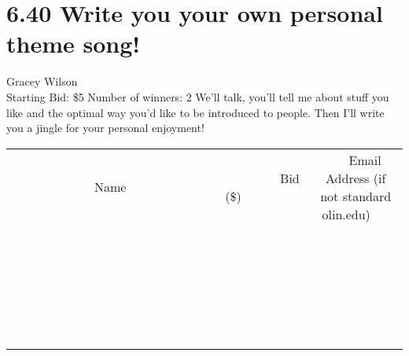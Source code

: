 \documentclass[11pt]{article}
\begin{document}
\section*{6.40 Write you your own personal theme song!}
Gracey Wilson
\\
Starting Bid: \$5
\newline
Number of winners: 2
\newline
We'll talk, you'll tell me about stuff you like and the optimal way you'd like to be introduced to people. Then I'll write you a jingle for your personal enjoyment!
\\[6ex]
\begin{tabular}{c c c}
~~~~~~~~~~~~~Name~~~~~~~~~~~~~ & ~~~~~~~~~Bid (\$)~~~~~~~~~  & ~~~Email Address (if not standard olin.edu)~~~\\
 & & \\
\hline
 & & \\
\hline
 & & \\
\hline
 & & \\
\hline
 & & \\
\hline
 & & \\
\hline
 & & \\
\hline
 & & \\
\hline
 & & \\
\hline
 & & \\
\hline
 & & \\
\hline
 & & \\
\hline
 & & \\
\hline
 & & \\
\hline
 & & \\
\hline
 & & \\
\hline
 & & \\
\hline
 & & \\
\hline
 & & \\
\hline
 & & \\
\hline
 & & \\
\hline
 & & \\
\hline
 & & \\
\hline
 & & \\
\hline
 & & \\
\hline
 & & \\
\hline
\end{tabular}
\newpage
\end{document}
